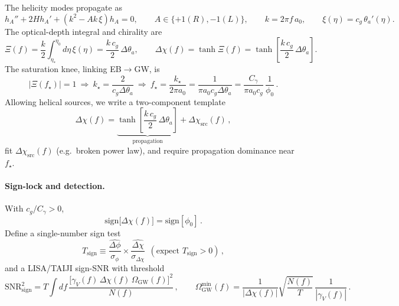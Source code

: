 \documentclass[11pt]{article}
\begin{document}
The helicity modes propagate as
\begin{equation}
h_A'' + 2H h_A' + \left(k^2 - A k\, \xi\right) h_A = 0,\qquad A\in\{+1(R),-1(L)\},\qquad k = 2\pi f\, a_0,\qquad \xi(\eta)=c_g\,\theta_a'(\eta).
\end{equation}
The optical-depth integral and chirality are
\begin{equation}
\Xi(f) = \frac{k}{2}\int_{\eta_*}^{\eta_0} d\eta\, \xi(\eta) = \frac{k\, c_g}{2}\,\Delta\theta_a,
\qquad 
\Delta \chi(f) = \tanh \Xi(f) = \tanh\!\left[\frac{k\, c_g}{2}\,\Delta\theta_a\right].
\end{equation}
The saturation knee, linking EB$\to$GW, is
\begin{equation}
\label{eq:fknee}
|\Xi(f_\star)| = 1 \ \Rightarrow\ k_\star = \frac{2}{c_g \Delta\theta_a}
\ \Rightarrow\ 
f_\star = \frac{k_\star}{2\pi a_0} = \frac{1}{\pi a_0 c_g \Delta\theta_a} = \frac{C_\gamma}{\pi a_0 c_g}\,\frac{1}{\phi_0}\, .
\end{equation}
Allowing helical sources, we write a two-component template
\begin{equation}
\Delta \chi(f) = \underbrace{\tanh\!\left[\frac{k\, c_g}{2}\, \Delta\theta_a\right]}_{\text{propagation}} + \Delta\chi_{\text{src}}(f)\, ,
\end{equation}
fit $\Delta\chi_{\text{src}}(f)$ (e.g.\ broken power law), and require propagation dominance near $f_\star$.

\paragraph{Sign-lock and detection.} With $c_g/C_\gamma>0$,
\begin{equation}
\mathrm{sign}\big[\Delta\chi(f)\big] = \mathrm{sign}[\phi_0]\, .
\end{equation}
Define a single-number sign test
\begin{equation}
T_{\mathrm{sign}} \equiv \frac{\widehat{\Delta\phi}}{\sigma_\phi}\times \frac{\widehat{\Delta\chi}}{\sigma_{\Delta\chi}}\ \ (\text{expect }T_{\mathrm{sign}}>0)\, ,
\end{equation}
and a LISA/TAIJI sign-SNR with threshold
\begin{equation}
\mathrm{SNR}^2_{\mathrm{sign}} = T\int df\, \frac{\big[\gamma_V(f)\,\Delta\chi(f)\,\Omega_{\mathrm{GW}}(f)\big]^2}{N(f)}\, , 
\qquad 
\Omega^{\min}_{\mathrm{GW}}(f) = \frac{1}{|\Delta\chi(f)|}\sqrt{\frac{N(f)}{T}}\,\frac{1}{|\gamma_V(f)|}\, .
\end{equation}
\end{document}
